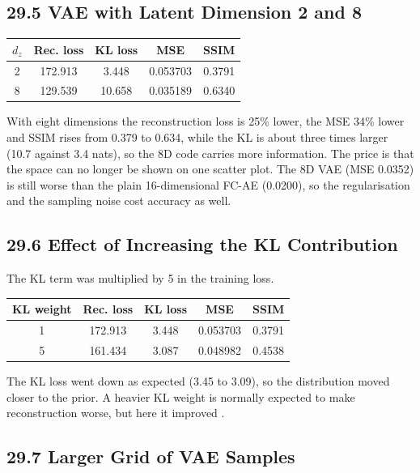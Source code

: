 \documentclass[10pt]{article}
\begin{document}
\subsection*{29.5 VAE with Latent Dimension 2 and 8}

\begin{center}
\begin{tabular}{|c|c|c|c|c|}
\hline
$d_z$ & Rec. loss & KL loss & MSE & SSIM\\
\hline
2 & 172.913 & 3.448 & 0.053703 & 0.3791\\
8 & 129.539 & 10.658 & 0.035189 & 0.6340\\
\hline
\end{tabular}
\end{center}

With eight dimensions the reconstruction loss is 25\% lower, the MSE 34\% lower and
SSIM rises from 0.379 to 0.634, while the KL is about three times larger (10.7
against 3.4 nats), so the 8D code carries more information. The price is that the
space can no longer be shown on one scatter plot. The 8D VAE (MSE 0.0352) is still
worse than the plain 16-dimensional FC-AE (0.0200), so the regularisation and the
sampling noise cost accuracy as well.

\subsection*{29.6 Effect of Increasing the KL Contribution}

The KL term was multiplied by 5 in the training loss.

\begin{center}
\begin{tabular}{|c|c|c|c|c|}
\hline
KL weight & Rec. loss & KL loss & MSE & SSIM\\
\hline
1 & 172.913 & 3.448 & 0.053703 & 0.3791\\
5 & 161.434 & 3.087 & 0.048982 & 0.4538\\
\hline
\end{tabular}
\end{center}

The KL loss went down as expected (3.45 to 3.09), so the distribution moved closer
to the prior. A
heavier KL weight is normally expected to make reconstruction worse, but here it
improved .

\subsection*{29.7 Larger Grid of VAE Samples}
\end{document}

